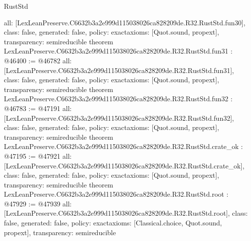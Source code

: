 \begin{lexlean}{RustStd}
\begin{coremodule}
{  all: [LexLeanPreserve.C6632b3a2e999d115038026ca828209de.R32.RustStd.fun30],
  class: false,
  generated: false,
  policy: exact{axioms: [Quot.sound, propext]},
  transparency: semireducible
}
theorem LexLeanPreserve.C6632b3a2e999d115038026ca828209de.R32.RustStd.fun31 : @46400 := @46782 {
  all: [LexLeanPreserve.C6632b3a2e999d115038026ca828209de.R32.RustStd.fun31],
  class: false,
  generated: false,
  policy: exact{axioms: [Quot.sound, propext]},
  transparency: semireducible
}
theorem LexLeanPreserve.C6632b3a2e999d115038026ca828209de.R32.RustStd.fun32 : @46783 := @47191 {
  all: [LexLeanPreserve.C6632b3a2e999d115038026ca828209de.R32.RustStd.fun32],
  class: false,
  generated: false,
  policy: exact{axioms: [Quot.sound, propext]},
  transparency: semireducible
}
theorem LexLeanPreserve.C6632b3a2e999d115038026ca828209de.R32.RustStd.crate_ok : @47195 := @47921 {
  all: [LexLeanPreserve.C6632b3a2e999d115038026ca828209de.R32.RustStd.crate_ok],
  class: false,
  generated: false,
  policy: exact{axioms: [Quot.sound, propext]},
  transparency: semireducible
}
theorem LexLeanPreserve.C6632b3a2e999d115038026ca828209de.R32.RustStd.root : @47929 := @47939 {
  all: [LexLeanPreserve.C6632b3a2e999d115038026ca828209de.R32.RustStd.root],
  class: false,
  generated: false,
  policy: exact{axioms: [Classical.choice, Quot.sound, propext]},
  transparency: semireducible
}


\end{coremodule}
\end{lexlean}
